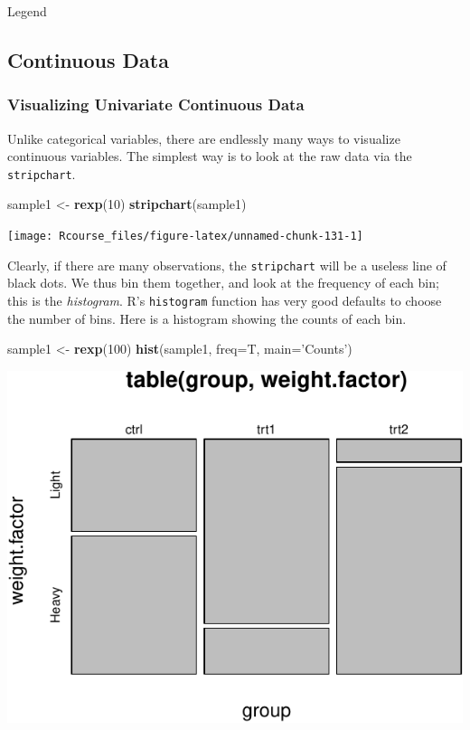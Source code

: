 \documentclass[]{book}
\newenvironment{Shaded}{\begin{snugshade}}{\end{snugshade}}
\newcommand{\DataTypeTok}[1]{\textcolor[rgb]{0.13,0.29,0.53}{#1}}
\newcommand{\DecValTok}[1]{\textcolor[rgb]{0.00,0.00,0.81}{#1}}
\newcommand{\KeywordTok}[1]{\textcolor[rgb]{0.13,0.29,0.53}{\textbf{#1}}}
\newcommand{\NormalTok}[1]{#1}
\newcommand{\StringTok}[1]{\textcolor[rgb]{0.31,0.60,0.02}{#1}}
\theoremstyle{definition}
\theoremstyle{definition}
\theoremstyle{definition}
\theoremstyle{remark}
\begin{document}
\hypertarget{htmlwidget-b694ade7e88e2471bfb0}{}
Legend

\hypertarget{continuous-data}{%
\subsection{Continuous Data}\label{continuous-data}}

\hypertarget{visualizing-univariate-continuous-data}{%
\subsubsection{Visualizing Univariate Continuous Data}\label{visualizing-univariate-continuous-data}}

Unlike categorical variables, there are endlessly many ways to visualize continuous variables.
The simplest way is to look at the raw data via the \texttt{stripchart}.

\begin{Shaded}
\begin{Highlighting}[]
\NormalTok{sample1 <-}\StringTok{ }\KeywordTok{rexp}\NormalTok{(}\DecValTok{10}\NormalTok{)                             }
\KeywordTok{stripchart}\NormalTok{(sample1)}
\end{Highlighting}
\end{Shaded}

\texttt{[image: Rcourse\_files/figure-latex/unnamed-chunk-131-1]}

Clearly, if there are many observations, the \texttt{stripchart} will be a useless line of black dots.
We thus bin them together, and look at the frequency of each bin; this is the \emph{histogram}.
R's \texttt{histogram} function has very good defaults to choose the number of bins.
Here is a histogram showing the counts of each bin.

\begin{Shaded}
\begin{Highlighting}[]
\NormalTok{sample1 <-}\StringTok{ }\KeywordTok{rexp}\NormalTok{(}\DecValTok{100}\NormalTok{)                            }
\KeywordTok{hist}\NormalTok{(sample1, }\DataTypeTok{freq=}\NormalTok{T, }\DataTypeTok{main=}\StringTok{'Counts'}\NormalTok{)        }
\end{Highlighting}
\end{Shaded}

\includegraphics[width=0.5\linewidth]{Rcourse_files/figure-latex/unnamed-chunk-132-1}
\end{document}
